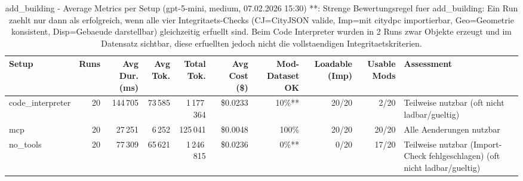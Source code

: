 \documentclass[a4paper,11pt]{article}
\begin{document}
\begin{table}[H]
\centering
\scriptsize
\caption{add\_building - Average Metrics per Setup (gpt-5-mini, medium, 07.02.2026 15:30) **: Strenge Bewertungsregel fuer add\_building: Ein Run zaehlt nur dann als erfolgreich, wenn alle vier Integritaets-Checks (CJ=CityJSON valide, Imp=mit citydpc importierbar, Geo=Geometrie konsistent, Disp=Gebaeude darstellbar) gleichzeitig erfuellt sind. Beim Code Interpreter wurden in 2 Runs zwar Objekte erzeugt und im Datensatz sichtbar, diese erfuellten jedoch nicht die vollstaendigen Integritaetskriterien.}
\label{tab:combined\_add\_building\_metrics\_20260207}
\begin{tabular}{l r r r r r r r r l}
\toprule
Setup & Runs & Avg Dur. (ms) & Avg Tok. & Total Tok. & Avg Cost (\$) & Mod-Dataset OK & Loadable (Imp) & Usable Mods & Assessment \\
\midrule
code\_interpreter & 20 & 144\,705 & 73\,585 & 1\,177\,364 & \$0.0233 & 10\%** & 20/20 & 2/20 & Teilweise nutzbar (oft nicht ladbar/gueltig) \\
mcp & 20 & 27\,251 & 6\,252 & 125\,041 & \$0.0048 & 100\% & 20/20 & 20/20 & Alle Aenderungen nutzbar \\
no\_tools & 20 & 77\,309 & 65\,621 & 1\,246\,815 & \$0.0236 & 0\%** & 0/20 & 17/20 & Teilweise nutzbar (Import-Check fehlgeschlagen) (oft nicht ladbar/gueltig) \\
\bottomrule
\end{tabular}
\end{table}
\end{document}
